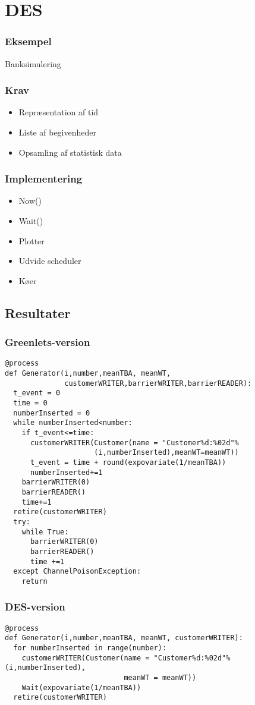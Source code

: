 \documentclass[12pt]{beamer}
\begin{document}
\section{DES}
\begin{frame}
  \frametitle{Eksempel}
Banksimulering
\end{frame}

\begin{frame}
  \frametitle{Krav}
  \begin{itemize}   
	\item Repræsentation af tid
	\item Liste af begivenheder
	\item Opsamling af statistisk data
  \end{itemize}
\end{frame}

\begin{frame}
\frametitle{Implementering}
  \begin{itemize}   
	\item Now()
	\item Wait()
	\item Plotter
	\item Udvide scheduler
	\item Køer
  \end{itemize}
\end{frame}

\subsection{Resultater}
\begin{frame}[fragile]
  \frametitle{Greenlets-version}
\begin{lstlisting}
@process
def Generator(i,number,meanTBA, meanWT,
              customerWRITER,barrierWRITER,barrierREADER):
  t_event = 0
  time = 0
  numberInserted = 0
  while numberInserted<number:
    if t_event<=time:
      customerWRITER(Customer(name = "Customer%d:%02d"%
                     (i,numberInserted),meanWT=meanWT))
      t_event = time + round(expovariate(1/meanTBA))
      numberInserted+=1
    barrierWRITER(0)
    barrierREADER()
    time+=1
  retire(customerWRITER)
  try:
    while True:
      barrierWRITER(0)
      barrierREADER()
      time +=1
  except ChannelPoisonException: 
    return
\end{lstlisting}
\end{frame}

\begin{frame}[fragile]
  \frametitle{DES-version}
\begin{lstlisting}
@process
def Generator(i,number,meanTBA, meanWT, customerWRITER):
  for numberInserted in range(number):
    customerWRITER(Customer(name = "Customer%d:%02d"%(i,numberInserted),
                            meanWT = meanWT))
    Wait(expovariate(1/meanTBA))
  retire(customerWRITER)
\end{lstlisting}
\end{frame}
\end{document}
